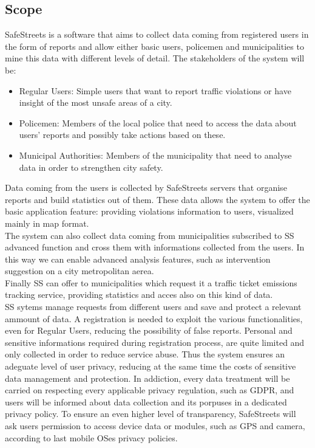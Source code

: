 \subsection{Scope}
SafeStreets is a software that aims to collect data coming from registered users in the form of reports and allow either basic users, policemen and municipalities to mine this data with different levels of detail.
The stakeholders of the system will be:
\begin{itemize}
	\item Regular Users: Simple users that want to report traffic violations or have insight of the most unsafe areas of a city.
	\item Policemen: Members of the local police that need to access the data about users' reports and possibly take actions based on these. 
	\item Municipal Authorities: Members of the municipality that need to analyse data in order to strengthen city safety.
\end{itemize}
Data coming from the users is collected by SafeStreets servers that organise reports and build statistics out of them. These data allows the system to offer the basic application feature: providing violations information to users, visualized mainly in map format.\\
The system can also collect data coming from municipalities subscribed to SS advanced function and cross them with informations collected from the users. In this way we can enable advanced analysis  features, such as intervention suggestion on a city metropolitan aerea.\\
Finally SS can offer to municipalities  which request it a traffic ticket emissions tracking service, providing statistics and acces also on this kind of data.\\
SS sytems manage requests from different users and save and protect a relevant ammount of data.\newline
A registration is needed to exploit the various functionalities, even for Regular Users, reducing the possibility of false reports. Personal and sensitive informations required during registration process, are quite limited and only collected in order to reduce service abuse. Thus the system ensures an adeguate level of user privacy, reducing at the same time the costs of sensitive data management and protection.\newline
In addiction, every data treatment will be carried on respecting every applicable privacy regulation, such as GDPR, and users will be informed about data collection and its porpuses in a dedicated privacy policy.\newline
To ensure an even higher level of transparency, SafeStreets will ask users permission to access device data or modules, such as GPS and camera, according to last mobile OSes privacy policies.

